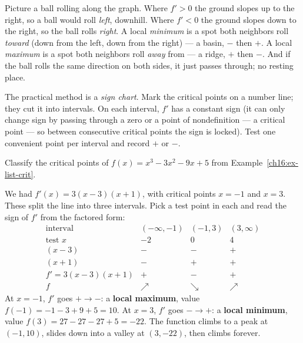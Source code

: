 \begin{intuitionbox}
Picture a ball rolling along the graph. Where $f'>0$ the ground slopes up to the
right, so a ball would roll \emph{left}, downhill. Where $f'<0$ the ground slopes
down to the right, so the ball rolls \emph{right}. A local \emph{minimum} is a spot
both neighbors roll \emph{toward} (down from the left, down from the right) --- a
basin, $-$ then $+$. A local \emph{maximum} is a spot both neighbors roll
\emph{away} from --- a ridge, $+$ then $-$. And if the ball rolls the same
direction on both sides, it just passes through; no resting place.
\end{intuitionbox}

The practical method is a \emph{sign chart}. Mark the critical points on a number
line; they cut it into intervals. On each interval, $f'$ has a constant sign
(it can only change sign by passing through a zero or a point of nondefinition ---
a critical point --- so between consecutive critical points the sign is locked).
Test one convenient point per interval and record $+$ or $-$.

\begin{example}\label{ch16:ex-fdt}
Classify the critical points of $f(x)=x^3-3x^2-9x+5$ from
Example~\ref{ch16:ex-list-crit}.

\smallskip
We had $f'(x)=3(x-3)(x+1)$, with critical points $x=-1$ and $x=3$. These split the
line into three intervals. Pick a test point in each and read the sign of $f'$ from
the factored form:
\[
\begin{array}{c|ccc}
\text{interval} & (-\infty,-1) & (-1,3) & (3,\infty)\\\hline
\text{test } x & -2 & 0 & 4\\
(x-3) & - & - & +\\
(x+1) & - & + & +\\
f'=3(x-3)(x+1) & + & - & +\\
f & \nearrow & \searrow & \nearrow
\end{array}
\]
At $x=-1$, $f'$ goes $+\to-$: a \textbf{local maximum}, value
$f(-1)=-1-3+9+5=10$. At $x=3$, $f'$ goes $-\to+$: a \textbf{local minimum}, value
$f(3)=27-27-27+5=-22$. The function climbs to a peak at $(-1,10)$, slides down into
a valley at $(3,-22)$, then climbs forever.
\end{example}

